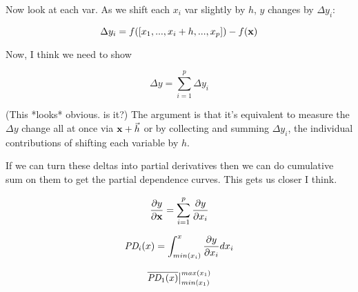 \documentclass[12pt]{article}
\newcommand{\cut}[1]{}
\begin{document}
Now look at each var. As we shift each $x_i$ var slightly by $h$, $y$ changes by $\Delta y_i$:

\[
\Delta y_i = f([x_1, ..., x_i+h, ..., x_p]) - f({\bf x})
\]

Now, I think we need to show

\[
\Delta y = \sum_{i=1}^{p} \Delta y_i
\]

(This *looks* obvious. is it?) The argument is that it's equivalent to measure the $\Delta y$ change all at once via ${\bf x} + \vec{h}$ or by collecting and summing $\Delta y_i$, the individual contributions of shifting each variable by $h$.  

If we can turn these deltas into partial derivatives then we can do cumulative sum on them to get the partial dependence curves. This gets us closer I think.


\[
\frac{\partial y}{\partial \bf x} = \sum_{i=1}^p \frac{\partial y}{\partial x_i}
\]

\[
\text{\it PD}_i(x) = \int_{min(x_i)}^x \frac{\partial y}{\partial x_i} dx_i
\]

\[
\overline{\text{\it PD}_1(x)}\big |_{min(x_1)}^{max(x_1)}
\]

\cut{
\noindent At $x_i$ for some $h$ (maybe $h$ is instance index).

Define the gradient:

\[
\nabla {\bf x} = [\frac{\partial y}{\partial x_1}, \ldots, \frac{\partial y}{\partial x_p}]
\]

When we move from ${\bf x}$ to ${\bf x}+\nabla {\bf x}$, we add some $\Delta y$ to $y$ so

\[
f({\bf x}+\nabla {\bf x}) = y + \Delta y 
\]

I think we need to show

\[
\Delta y_i = \frac{f(x_i + h) - f(x_i)}{h}
\]

\[
\Delta y = \sum_{i=1}^{p} \Delta y_i
\]
}




\end{document}

